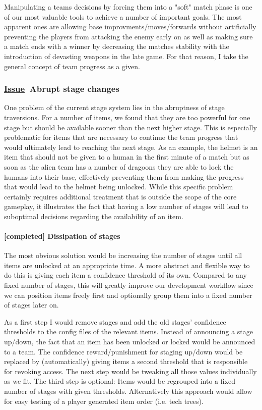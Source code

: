\documentclass{scrartcl}
\newcommand{\issue}    [0]{\textbf{\underline{Issue}\ }}
\newcommand{\completed}[0]{\textcolor{completed}{\textbf{[completed] }}}
\begin{document}
Manipulating a teams decisions by forcing them into a "soft" match phase is one of our most valuable tools to achieve a number of important goals. The most apparent ones are allowing base improvments/moves/forwards without artificially preventing the players from attacking the enemy early on as well as making sure a match ends with a winner by decreasing the matches stability with the introduction of devasting weapons in the late game. For that reason, I take the general concept of team progress as a given.

\subsubsection{\issue Abrupt stage changes}

One problem of the current stage system lies in the abruptness of stage traversions. For a number of items, we found that they are too powerful for one stage but should be available sooner than the next higher stage. This is especially problematic for items that are necessary to continue the team progress that would ultimately lead to reaching the next stage. As an example, the helmet is an item that should not be given to a human in the first minute of a match but as soon as the alien team has a number of dragoons they are able to lock the humans into their base, effectively preventing them from making the progress that would lead to the helmet being unlocked. While this specific problem certainly requires additional treatment that is outside the scope of the core gameplay, it illustrates the fact that having a low number of stages will lead to suboptimal decisions regarding the availability of an item.

\paragraph{\completed Dissipation of stages}

The most obvious solution would be increasing the number of stages until all items are unlocked at an appropriate time. A more abstract and flexible way to do this is giving each item a confidence threshold of its own. Compared to  any fixed number of stages, this will greatly improve our development workflow since we can position items freely first and optionally group them into a fixed number of stages later on.

As a first step I would remove stages and add the old stages' confidence thresholds to the config files of the relevant items. Instead of announcing a stage up/down, the fact that an item has been unlocked or locked would be announced to a team. The confidence reward/punishment for staging up/down would be replaced by (automatically) giving items a second threshold that is responsible for revoking access. The next step would be tweaking all those values individually as we fit. The third step is optional: Items would be regrouped into a fixed number of stages with given thresholds. Alternatively this approach would allow for easy testing of a player generated item order (i.e. tech trees).
\end{document}
